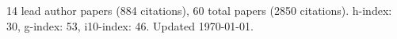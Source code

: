 14 lead author papers (884 citations),
60 total papers (2850 citations).\newline
h-index: 30, g-index: 53, i10-index: 46. Updated \today.